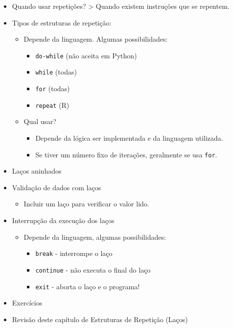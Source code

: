 \documentclass[12pt,a4paper]{article}
\providecommand{\tightlist}{%
      \setlength{\itemsep}{0pt}\setlength{\parskip}{0pt}}
\begin{document}
\begin{itemize}
\tightlist
\item
  Quando usar repetições? \textgreater{} Quando existem instruções que
  se repentem.
\item
  Tipos de estruturas de repetição:

  \begin{itemize}
  \tightlist
  \item
    Depende da linguagem. Algumas possibilidades:

    \begin{itemize}
    \tightlist
    \item
      \texttt{do-while} (não aceita em Python)
    \item
      \texttt{while} (todas)
    \item
      \texttt{for} (todas)
    \item
      \texttt{repeat} (R)
    \end{itemize}
  \item
    Qual usar?

    \begin{itemize}
    \tightlist
    \item
      Depende da lógica ser implementada e da linguagem utilizada.
    \item
      Se tiver um número fixo de iterações, geralmente se usa
      \texttt{for}.
    \end{itemize}
  \end{itemize}
\item
  Laços aninhados
\item
  Validação de dados com laços

  \begin{itemize}
  \tightlist
  \item
    Incluir um laço para verificar o valor lido.
  \end{itemize}
\item
  Interrupção da execução dos laços

  \begin{itemize}
  \tightlist
  \item
    Depende da linguagem, algumas possibilidades:

    \begin{itemize}
    \tightlist
    \item
      \texttt{break} - interrompe o laço
    \item
      \texttt{continue} - não executa o final do laço
    \item
      \texttt{exit} - aborta o laço e o programa!
    \end{itemize}
  \end{itemize}
\item
  Exercícios
\item
  Revisão deste capítulo de Estruturas de Repetição (Laços)
\end{itemize}
\end{document}
